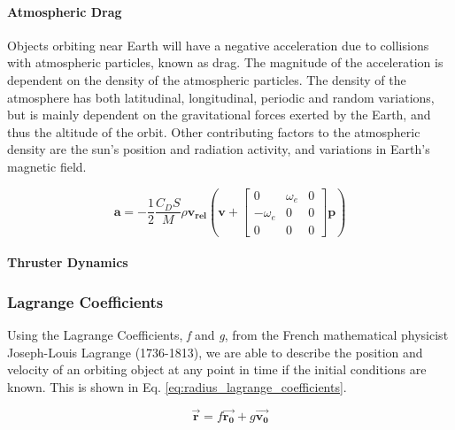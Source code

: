 \paragraph{Atmospheric Drag}

Objects orbiting near Earth will have a negative acceleration due to collisions with atmospheric particles, known as drag. The magnitude of the acceleration is dependent on the density of the atmospheric particles. The density of the atmosphere has both latitudinal, longitudinal, periodic and random variations, but is mainly dependent on the gravitational forces exerted by the Earth, and thus the altitude of the orbit. Other contributing factors to the atmospheric density are the sun's position and radiation activity, and variations in Earth's magnetic field. \\


\begin{equation}
    \mathbf{a} = - \frac{1}{2} \frac{C_D S}{M} \rho \mathbf{v_{rel}} \left( \mathbf{v} + \begin{bmatrix} 0 & \omega_e & 0 \\ -\omega_e & 0 & 0 \\ 0 & 0 & 0 \end{bmatrix} \mathbf{p} \right)
\end{equation}{}


\paragraph{Thruster Dynamics}


\subsubsection{Lagrange Coefficients}

Using the Lagrange Coefficients, \textit{f} and \textit{g}, from the French mathematical physicist Joseph-Louis Lagrange (1736-1813), we are able to describe the position and velocity of an orbiting object at any point in time if the initial conditions are known. This is shown in Eq. \ref{eq:radius_lagrange_coefficients}. 


\begin{equation}
    \Vec{\mathbf{r}} = f \Vec{\mathbf{r_0}} + g \Vec{\mathbf{v_0}}
    \label{eq:radius_lagrange_coefficients}
\end{equation}

